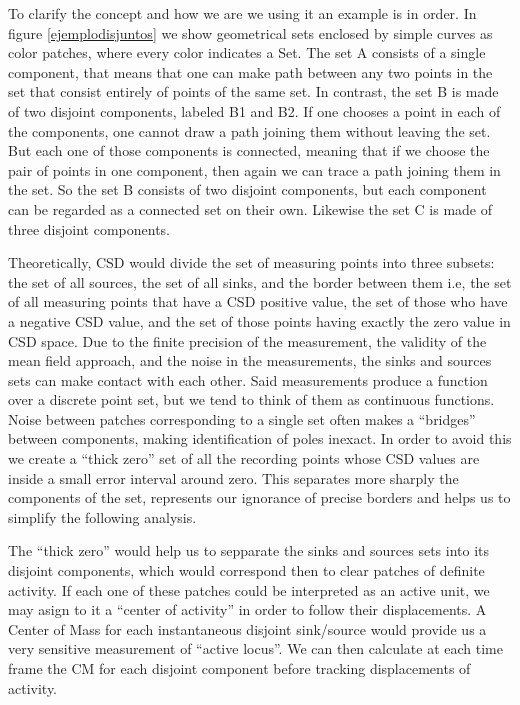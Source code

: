 \documentclass{article}
\begin{document}
To clarify the concept and how we are we using it an example is in order. In figure \ref{ejemplodisjuntos} we show geometrical sets enclosed by simple curves as color patches, where every color indicates a Set. The set A consists of a single component, that means that one can make  path between any two points in the set that consist entirely of points of the same set. In contrast, the set B is made of two disjoint components, labeled B1 and B2. If one chooses a point in each of the components, one cannot draw a path joining them without leaving the set. But each one of those components is connected, meaning that if we choose the pair of points in one component, then again we can trace a path joining them in the set. So the set B consists of two disjoint components, but each component can be regarded as a connected set on their own. Likewise the set C is made of three disjoint components. 
 
Theoretically, CSD would divide the set of measuring points into three subsets: the set of all sources, the set of all sinks, and the border between them i.e, the set of all measuring points that have a CSD positive value, the set of those who have a negative CSD value, and the set of those points having exactly the zero value in CSD space.
Due to the finite precision of the measurement, the validity of the mean field approach, and the noise in the measurements, the sinks and sources sets can make contact with each other. Said measurements produce a function over a discrete point set, but we tend to think of them as continuous functions. Noise between patches corresponding to a single set often makes a ``bridges'' between components, making identification of poles inexact. In order to avoid this we create a ``thick zero'' set of all the recording points whose CSD values are inside a small error interval around zero. This separates more sharply the components of the set, represents our ignorance of precise borders and helps us to simplify the following analysis.

The ``thick zero'' would help us to sepparate the sinks and sources sets into its disjoint components, which would correspond then to clear patches of definite activity. If each one of these patches could be interpreted as an active unit, we may asign to it a ``center of activity'' in order to follow their displacements. A Center of Mass for each instantaneous disjoint sink/source would provide us a very sensitive measurement of ``active locus''. We can then calculate at each time frame the CM for each disjoint component before tracking displacements of activity.
\end{document}
